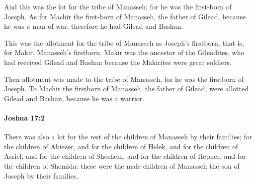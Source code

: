 			\begin{versebox}
					\item[BHS] 
					\item[ASV] And this was the lot for the tribe of Manasseh; for he was the first-born of Joseph. As for Machir the first-born of Manasseh, the father of Gilead, because he was a man of war, therefore he had Gilead and Bashan.
					\item[NIV] This was the allotment for the tribe of Manasseh as Joseph’s firstborn, that is, for Makir, Manasseh’s firstborn. Makir was the ancestor of the Gileadites, who had received Gilead and Bashan because the Makirites were great soldiers.
					\item[NRSV] Then allotment was made to the tribe of Manasseh, for he was the firstborn of Joseph. To Machir the firstborn of Manasseh, the father of Gilead, were allotted Gilead and Bashan, because he was a warrior.
			\end{versebox}

		\paragraph{Joshua 17:2} %
			\label{JOSHUA-17-2}

			There was also a lot for the rest of the children of Manasseh by their families; for the children of Abiezer, and for the children of Helek, and for the children of Asriel, and for the children of Shechem, and for the children of Hepher, and for the children of Shemida: these were the male children of Manasseh the son of Joseph by their families.

